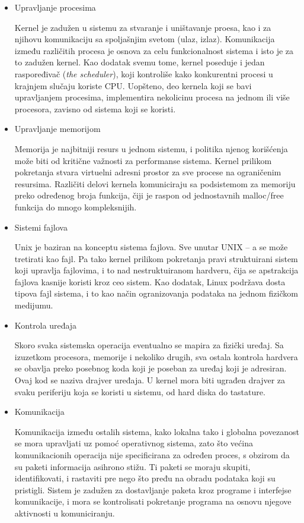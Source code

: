 \documentclass[a4paper, 12pt, diplomski]{etf}
\begin{document}
	\begin{itemize}

		\item Upravljanje procesima

	Kernel je zadužen u sistemu za stvaranje i uništavanje proesa, kao i za njihovu komunikaciju sa spoljašnjim svetom (ulaz, izlaz). Komunikacija između različitih procesa je osnova za celu funkcionalnost sistema i isto je za to zadužen kernel. Kao dodatak svemu tome, kernel poseduje i jedan raspoređivač (\textit{the scheduler}), koji kontroliše kako konkurentni procesi u krajnjem slučaju koriste CPU. Uopšteno, deo kernela koji se bavi upravljanjem procesima, implementira nekolicinu procesa na jednom ili više procesora, zavisno od sistema koji se koristi.

		\item Upravljanje memorijom

	Memorija je najbitniji resurs u jednom sistemu, i politika njenog korišćenja može biti od kritične važnosti za performanse sistema. Kernel prilikom pokretanja stvara virtuelni adresni prostor za sve procese na ograničenim resursima. Različiti delovi kernela komuniciraju sa podsistemom za memoriju preko određenog broja funkcija, čiji je raspon od jednostavnih malloc/free funkcija do mnogo kompleksnijih.

		\item Sistemi fajlova

	Unix je baziran na konceptu sistema fajlova. Sve unutar UNIX – a se može tretirati kao fajl. Pa tako kernel prilikom pokretanja pravi struktuirani sistem koji upravlja fajlovima, i to nad nestruktuiranom hardveru, čija se apstrakcija fajlova kasnije koristi kroz ceo sistem. Kao dodatak, Linux podržava dosta tipova fajl sistema, i to kao način ogranizovanja podataka na jednom fizičkom medijumu.

		\item Kontrola uređaja

	Skoro svaka sistemska operacija eventualno se mapira za fizički uređaj. Sa izuzetkom procesora, memorije i nekoliko drugih, sva ostala kontrola hardvera se obavlja preko posebnog koda koji je poseban za uređaj koji je adresiran. Ovaj kod se naziva drajver uređaja. U kernel mora biti ugrađen drajver za svaku periferiju koja se koristi u sistemu, od hard diska do tastature.

		\item Komunikacija

	Komunikacija između ostalih sistema, kako lokalna tako i globalna povezanost se mora upravljati uz pomoć operativnog sistema, zato što većina komunikacionih operacija nije specificirana za određen proces, s obzirom da su paketi informacija asihrono stižu. Ti paketi se moraju skupiti, identifikovati, i rastaviti pre nego što pređu na obradu podataka koji su pristigli. Sistem je zadužen za dostavljanje paketa kroz programe i interfejse komunikacije, i mora se kontrolisati pokretanje programa na osnovu njegove aktivnosti u komuniciranju.

	\end{itemize}
\end{document}
